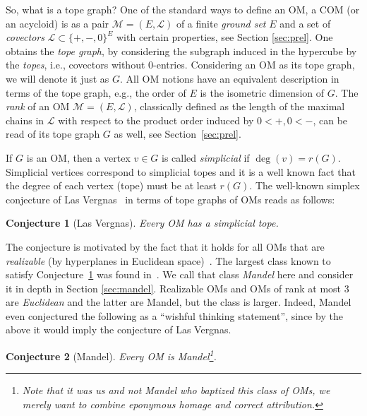 \documentclass[final,11pt]{article}
\newtheorem{conj}{Conjecture}%
\begin{document}
So, what is a tope graph? One of the standard ways to define an OM, a COM (or an acycloid) is as a pair $\mathcal{M}=(E,\mathcal{L})$ of a finite \emph{ground set} $E$ and a set of \emph{covectors} $\mathcal{L} \subset \{+,-,0\}^E$ with certain properties, see Section \ref{sec:prel}. One obtains the \emph{tope graph}, by considering the subgraph induced in the hypercube by the \emph{topes}, i.e., covectors without $0$-entries. Considering an OM as its tope graph, we will denote it just as $G$. All OM notions have an equivalent description in terms of the tope graph, e.g., the order of $E$ is the isometric dimension of $G$. The \emph{rank} of an OM $\mathcal{M}=(E,\mathcal{L})$, classically defined as the length of the maximal chains in $\mathcal{L}$ with respect to the product order induced by $0<+, 0<-$, can be read	 of its tope graph $G$ as well, see Section~\ref{sec:prel}.

If $G$ is an OM, then a vertex $v\in G$ is called  \emph{simplicial} if $\deg(v)=r(G)$.  Simplicial vertices correspond to simplicial topes and it is a well known fact that the degree of each vertex (tope) must be at least $r(G)$. The well-known simplex conjecture of Las Vergnas~\cite{lv-80} in terms of tope graphs of OMs reads as follows:

\begin{conj}[Las Vergnas]\label{conj:lasvergnas}
 Every OM has a simplicial tope.
\end{conj}
The conjecture is motivated by the fact that it holds for all OMs that are \emph{realizable} (by hyperplanes in Euclidean space)~\cite{Sha-79}.
The largest class known to satisfy Conjecture~\ref{conj:lasvergnas} was found in~\cite[Theorem 7]{Man-82}. We call that class \emph{Mandel} here and consider it in depth in Section \ref{sec:mandel}. Realizable OMs and OMs of rank at most $3$ are \emph{Euclidean} and the latter are Mandel, but the class is larger.
Indeed, Mandel~\cite[Conjecture 8]{Man-82} even conjectured the following as a ``wishful thinking statement'', since by the above it would imply the conjecture of Las Vergnas. 

\begin{conj}[Mandel]\label{conj:mandel}
 Every OM is Mandel\footnote{
Note that it was us and not Mandel who baptized this class of OMs, we merely 
want to combine eponymous homage and correct attribution.}.
\end{conj}
\end{document}
